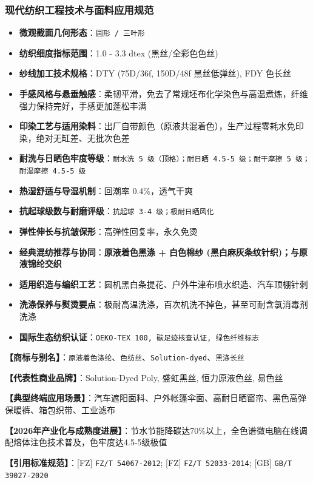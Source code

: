 \documentclass[11pt,openright,twoside,UTF8]{ctexbook}
\begin{document}
\subsubsection*{现代纺织工程技术与面料应用规范}
\begin{itemize} \setlength{\itemsep}{2pt}
    \item \textbf{微观截面几何形态}：\texttt{圆形 / 三叶形}
    \item \textbf{纺织细度指标范围}：1.0 - 3.3 dtex (黑丝/全彩色色丝)
    \item \textbf{纱线加工技术规格}：DTY (75D/36f, 150D/48f 黑丝低弹丝), FDY 色长丝
    \item \textbf{手感风格与悬垂触感}：柔韧平滑，免去了常规坯布化学染色与高温煮炼，纤维强力保持完好，手感更加蓬松丰满
    \item \textbf{印染工艺与适用染料}：出厂自带颜色（原液共混着色），生产过程零耗水免印染，绝对无缸差、无批次色差
    \item \textbf{耐洗与日晒色牢度等级}：\texttt{耐水洗 5 级（顶格）；耐日晒 4.5-5 级；耐干摩擦 5 级；耐湿摩擦 4.5-5 级}
    \item \textbf{热湿舒适与导湿机制}：回潮率 0.4\%，透气干爽
    \item \textbf{抗起球级数与耐磨评级}：\texttt{抗起球 3-4 级；极耐日晒风化}
    \item \textbf{弹性伸长与抗皱保形}：高弹性回复率，永久免烫
    \item \textbf{经典混纺推荐与协同}：\textbf{原液着色黑涤 + 白色棉纱 (黑白麻灰条纹针织)；与原液锦纶交织}
    \item \textbf{适用织造与编织工艺}：圆机黑白条提花、户外牛津布喷水织造、汽车顶棚针刺
    \item \textbf{洗涤保养与熨烫要点}：极耐高温洗涤，百次机洗不掉色，甚至可耐含氯消毒剂洗涤
    \item \textbf{国际生态纺织认证}：\texttt{OEKO-TEX 100, 碳足迹核查认证, 绿色纤维标志}
\end{itemize}
\vspace{0.2cm}

\noindent\textbf{【商标与别名】}：\texttt{原液着色涤纶}、\texttt{色纺丝}、\texttt{Solution-dyed}、\texttt{黑涤长丝}\par
\noindent\textbf{【代表性商业品牌】}：Solution-Dyed Poly, 盛虹黑丝, 恒力原液色丝, 易色丝\par
\noindent\textbf{【典型终端应用场景】}：汽车遮阳面料、户外帐篷伞面、高耐日晒窗帘、黑色高弹保暖裤、箱包织带、工业滤布\par
\noindent\textbf{【2026年产业化与成熟度进展】}：节水节能降碳达70\%以上，全色谱微电脑在线调配熔体注色技术普及，色牢度达4.5-5级极值\par
\noindent\textbf{【引用标准规范】}：[FZ] \texttt{FZ/T 54067-2012}; [FZ] \texttt{FZ/T 52033-2014}; [GB] \texttt{GB/T 39027-2020}\par
\vspace{0.5cm}
\end{document}
